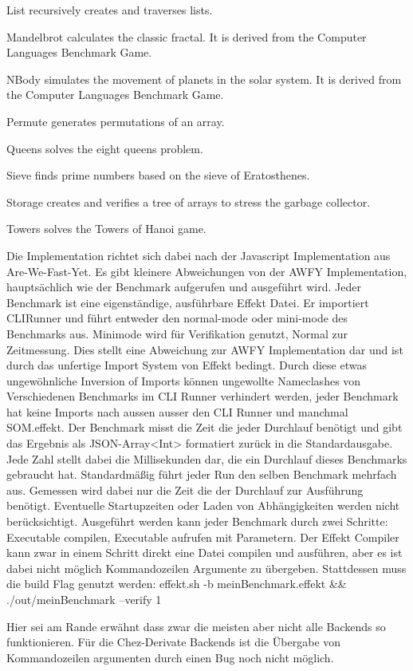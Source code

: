 List recursively creates and traverses lists.

Mandelbrot calculates the classic fractal. It is derived from the Computer Languages Benchmark Game.

NBody simulates the movement of planets in the solar system. It is derived from the Computer Languages Benchmark Game.

Permute generates permutations of an array.

Queens solves the eight queens problem.

Sieve finds prime numbers based on the sieve of Eratosthenes.

Storage creates and verifies a tree of arrays to stress the garbage collector.

Towers solves the Towers of Hanoi game.

Die Implementation richtet sich dabei nach der Javascript Implementation aus Are-We-Fast-Yet.
Es gibt kleinere Abweichungen von der AWFY Implementation, hauptsächlich wie der Benchmark aufgerufen und ausgeführt wird. 
Jeder Benchmark ist eine eigenständige, ausführbare Effekt Datei. Er importiert CLIRunner und führt entweder den normal-mode oder mini-mode des Benchmarks aus. Minimode wird für Verifikation genutzt, Normal zur Zeitmessung.
Dies stellt eine Abweichung zur AWFY Implementation dar und ist durch das unfertige Import System von Effekt bedingt.
Durch diese etwas ungewöhnliche Inversion of Imports können ungewollte Nameclashes von Verschiedenen Benchmarks im CLI Runner verhindert werden, jeder Benchmark hat keine Imports nach aussen ausser den CLI Runner und manchmal SOM.effekt.
Der Benchmark misst die Zeit die jeder Durchlauf benötigt und gibt das Ergebnis als JSON-Array<Int> formatiert zurück in die Standardausgabe. Jede Zahl stellt dabei die Millisekunden dar, die ein Durchlauf dieses Benchmarks gebraucht hat.
Standardmäßig führt jeder Run den selben Benchmark mehrfach aus.
Gemessen wird dabei nur die Zeit die der Durchlauf zur Ausführung benötigt. Eventuelle Startupzeiten oder Laden von Abhängigkeiten werden nicht berücksichtigt.
Ausgeführt werden kann jeder Benchmark durch zwei Schritte: Executable compilen, Executable aufrufen mit Parametern.
Der Effekt Compiler kann zwar in einem Schritt direkt eine Datei compilen und ausführen, aber es ist dabei nicht möglich Kommandozeilen Argumente zu übergeben.
Stattdessen muss die build Flag genutzt werden:
effekt.sh -b meinBenchmark.effekt && ./out/meinBenchmark --verify 1

Hier sei am Rande erwähnt dass zwar die meisten aber nicht alle Backends so funktionieren. Für die Chez-Derivate Backends ist die Übergabe von Kommandozeilen argumenten durch einen Bug noch nicht möglich.

